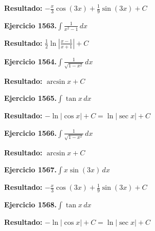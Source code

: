 \documentclass[10pt,a4paper]{article}
\begin{document}
\begin{solbox}
\textbf{Resultado:} \(\displaystyle -\frac{x}{3}\cos(3x) + \frac{1}{9}\sin(3x) + C\)
\end{solbox}

\begin{ejbox}
\textbf{Ejercicio 1563.}\quad $\int \frac{1}{x^2-1}\,dx$
\end{ejbox}

\begin{solbox}
\textbf{Resultado:} \(\displaystyle \frac{1}{2}\ln\left|\frac{x-1}{x+1}\right| + C\)
\end{solbox}

\newpage
\begin{ejbox}
\textbf{Ejercicio 1564.}\quad $\int \frac{1}{\sqrt{1-x^2}}\,dx$
\end{ejbox}

\begin{solbox}
\textbf{Resultado:} \(\displaystyle \arcsin x + C\)
\end{solbox}

\begin{ejbox}
\textbf{Ejercicio 1565.}\quad $\int \tan x\,dx$
\end{ejbox}

\begin{solbox}
\textbf{Resultado:} \(\displaystyle -\ln|\cos x| + C = \ln|\sec x| + C\)
\end{solbox}

\begin{ejbox}
\textbf{Ejercicio 1566.}\quad $\int \frac{1}{\sqrt{1-x^2}}\,dx$
\end{ejbox}

\begin{solbox}
\textbf{Resultado:} \(\displaystyle \arcsin x + C\)
\end{solbox}

\newpage
\begin{ejbox}
\textbf{Ejercicio 1567.}\quad $\int x \sin(3x)\,dx$
\end{ejbox}

\begin{solbox}
\textbf{Resultado:} \(\displaystyle -\frac{x}{3}\cos(3x) + \frac{1}{9}\sin(3x) + C\)
\end{solbox}

\begin{ejbox}
\textbf{Ejercicio 1568.}\quad $\int \tan x\,dx$
\end{ejbox}

\begin{solbox}
\textbf{Resultado:} \(\displaystyle -\ln|\cos x| + C = \ln|\sec x| + C\)
\end{solbox}
\end{document}
